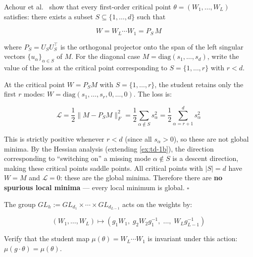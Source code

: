 \documentclass[11pt]{article}
\begin{document}
\begin{exercise}
\label{ex:td-1c}
Achour et al.~\cite{achour2024} show that every
first-order critical point \(\theta = (W_1, \ldots, W_L)\) satisfies:
there exists a subset \(S \subseteq \{1, \ldots, d\}\) such that

\[W = W_L \cdots W_1 = P_S\, M\]

where \(P_S = U_S U_S^\top\) is the orthogonal projector onto the span
of the left singular vectors \(\{u_\alpha\}_{\alpha \in S}\) of \(M\).
For the diagonal case \(M = \text{diag}(s_1, \ldots, s_d)\), write the
value of the loss at the critical point corresponding to
\(S = \{1, \ldots, r\}\) with \(r < d\).
\end{exercise}

\begin{solution}[ex:td-1c]
At the critical point \(W = P_S M\) with
\(S = \{1, \ldots, r\}\), the student retains only the first \(r\)
modes: \(W = \text{diag}(s_1, \ldots, s_r, 0, \ldots, 0)\). The loss is:

\[\mathcal{L} = \frac{1}{2}\|M - P_S M\|_F^2 = \frac{1}{2}\sum_{\alpha \notin S} s_\alpha^2 = \frac{1}{2}\sum_{\alpha=r+1}^d s_\alpha^2\]

This is strictly positive whenever \(r < d\) (since all
\(s_\alpha > 0\)), so these are not global minima. By the Hessian
analysis (extending \cref{ex:td-1b}), the direction corresponding to
``switching on'' a missing mode \(\alpha \notin S\) is a descent
direction, making these critical points saddle points. All critical
points with \(|S| = d\) have \(W = M\) and \(\mathcal{L} = 0\): these
are the global minima. Therefore there are \textbf{no spurious local
minima} --- every local minimum is global. \(\square\)
\end{solution}

\begin{exercise}
\label{ex:td-1d}
The group
\(GL_h := GL_{d_1} \times \cdots \times GL_{d_{L-1}}\) acts on the
weights by:

\[(W_1, \ldots, W_L) \mapsto (g_1 W_1,\; g_2 W_2 g_1^{-1},\; \ldots,\; W_L g_{L-1}^{-1})\]

Verify that the student map \(\mu(\theta) = W_L \cdots W_1\) is
invariant under this action: \(\mu(g \cdot \theta) = \mu(\theta)\).
\end{exercise}
\end{document}
